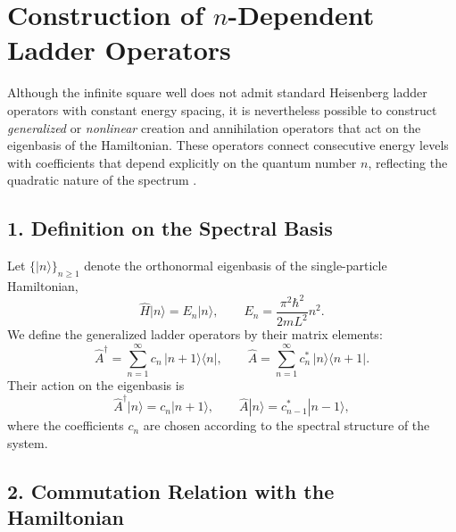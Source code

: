 \section{Construction of $n$-Dependent Ladder Operators}

Although the infinite square well does not admit standard Heisenberg ladder operators with constant energy spacing, it is nevertheless possible to construct \emph{generalized} or \emph{nonlinear} creation and annihilation operators that act on the eigenbasis of the Hamiltonian. These operators connect consecutive energy levels with coefficients that depend explicitly on the quantum number $n$, reflecting the quadratic nature of the spectrum \cite{Hussin2011, Jalali2013, Fernandez1999}.

\subsection*{1. Definition on the Spectral Basis}

Let $\{|n\rangle\}_{n\ge1}$ denote the orthonormal eigenbasis of the single-particle Hamiltonian,
\[
\hat{H}|n\rangle = E_n |n\rangle, \qquad E_n = \frac{\pi^2\hbar^2}{2mL^2}n^2.
\]
We define the generalized ladder operators by their matrix elements:
\begin{equation}
    \hat{A}^\dagger = \sum_{n=1}^{\infty} c_n\,|n+1\rangle\langle n|, \qquad
    \hat{A} = \sum_{n=1}^{\infty} c_n^*\,|n\rangle\langle n+1|.
\end{equation}
Their action on the eigenbasis is
\begin{equation}
    \hat{A}^\dagger|n\rangle = c_n|n+1\rangle, \qquad
    \hat{A}|n\rangle = c_{n-1}^*|n-1\rangle,
\end{equation}
where the coefficients $c_n$ are chosen according to the spectral structure of the system.

\subsection*{2. Commutation Relation with the Hamiltonian}

